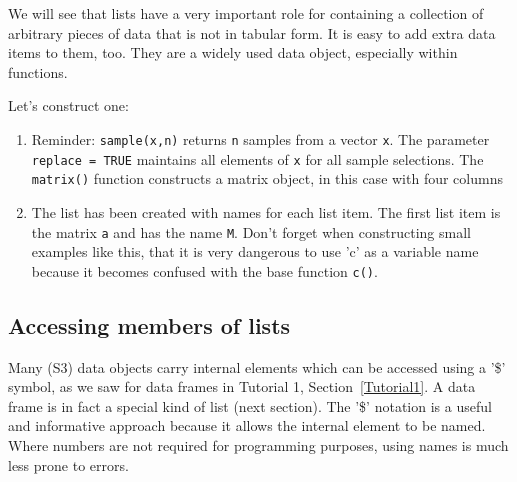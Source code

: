 \documentclass[titlepage]{book}\usepackage{knitr}
\begin{document}
We will see that lists have a very important role for containing a collection of arbitrary pieces of data that is not in tabular form. It is easy to add extra data items to them, too. They are a widely used data object, especially within functions.  

Let's construct one:

\begin{knitrout}
\color{fgcolor}\begin{kframe}
\begin{alltt}
\hlcom{##}
\hlcom{#---------------------------------------------------------------------------------}
  \hlkwb{<-} \hlstd{(}\hlstd{(}\hlopt{:}\hlstd{,} \hlstd{,} \hlstd{=}\hlstd{),} \hlstd{=}\hlstd{)}      
  \hlkwb{<-} \hlstd{(}\hlstd{(}\hlstd{,} \hlstd{,} \hlstd{,} \hlstd{,} \hlstd{),} \hlstd{)}
 \hlkwb{<-} \hlstd{(}\hlstd{,} \hlstd{)}
 \hlkwb{<-} \hlstd{(}                              
\end{alltt}
\end{kframe}
\end{knitrout}

\begin{enumerate}
\item{Reminder: \texttt{sample(x,n)} returns \texttt{n} samples from a vector \texttt{x}.  The parameter \texttt{replace = TRUE} maintains all elements of \texttt{x} for all sample selections. The \texttt{matrix()} function constructs a matrix object, in this case with four columns }
\item{The list has been created with names for each list item. The first list item is the matrix \texttt{a} and has the name \texttt{M}. Don't forget when constructing small examples like this, that it is very dangerous to use 'c' as a variable name because it becomes confused with the base function \texttt{c()}. }
\end{enumerate}

\subsection{Accessing members of lists}\label{L2ListAccess}
Many (S3) data objects carry internal elements which can be accessed using a '\$' symbol, as we saw for data frames in Tutorial 1, Section~\ref{Tutorial1}.  A data frame is in fact a special kind of list (next section). The '\$' notation is a useful and informative approach because it allows the internal element to be named. Where numbers are not required for programming purposes, using names is much less prone to errors.
\end{document}
